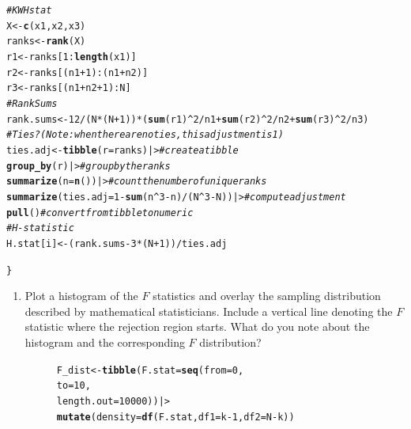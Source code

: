 \documentclass{article}\usepackage[]{graphicx}\usepackage[]{xcolor}
\makeatletter
\newcommand{\hlnum}[1]{\textcolor[rgb]{0.686,0.059,0.569}{#1}}%
\newcommand{\hlcom}[1]{\textcolor[rgb]{0.678,0.584,0.686}{\textit{#1}}}%
\newcommand{\hlopt}[1]{\textcolor[rgb]{0,0,0}{#1}}%
\newcommand{\hldef}[1]{\textcolor[rgb]{0.345,0.345,0.345}{#1}}%
\newcommand{\hlkwb}[1]{\textcolor[rgb]{0.69,0.353,0.396}{#1}}%
\newcommand{\hlkwc}[1]{\textcolor[rgb]{0.333,0.667,0.333}{#1}}%
\newcommand{\hlkwd}[1]{\textcolor[rgb]{0.737,0.353,0.396}{\textbf{#1}}}%
\newenvironment{kframe}{%
 \def\at@end@of@kframe{}%
 \ifinner\ifhmode%
  \def\at@end@of@kframe{\end{minipage}}%
  \begin{minipage}{\columnwidth}%
 \fi\fi%
 \def\FrameCommand##1{\hskip\@totalleftmargin \hskip-\fboxsep
 \colorbox{shadecolor}{##1}\hskip-\fboxsep
     \hskip-\linewidth \hskip-\@totalleftmargin \hskip\columnwidth}%
 \MakeFramed {\advance\hsize-\width
   \@totalleftmargin\z@ \linewidth\hsize
   \@setminipage}}%
 {\par\unskip\endMakeFramed%
 \at@end@of@kframe}
\newenvironment{knitrout}{}{} %
\makeatother
\begin{document}
\begin{enumerate}
\begin{knitrout}
\begin{kframe}
\begin{alltt}
  \hlcom{# KW H stat}
  \hldef{X} \hlkwb{<-} \hlkwd{c}\hldef{(x1, x2, x3)}
  \hldef{ranks} \hlkwb{<-} \hlkwd{rank}\hldef{(X)}
  \hldef{r1} \hlkwb{<-} \hldef{ranks[}\hlnum{1}\hlopt{:}\hlkwd{length}\hldef{(x1)]}
  \hldef{r2} \hlkwb{<-} \hldef{ranks[(n1}\hlopt{+}\hlnum{1}\hldef{)}\hlopt{:}\hldef{(n1}\hlopt{+}\hldef{n2)]}
  \hldef{r3} \hlkwb{<-} \hldef{ranks[(n1}\hlopt{+}\hldef{n2}\hlopt{+}\hlnum{1}\hldef{)}\hlopt{:}\hldef{N]}
  \hlcom{# Rank Sums}
  \hldef{rank.sums} \hlkwb{<-} \hlnum{12}\hlopt{/}\hldef{(N}\hlopt{*}\hldef{(N}\hlopt{+}\hlnum{1}\hldef{))} \hlopt{*} \hldef{(}\hlkwd{sum}\hldef{(r1)}\hlopt{^}\hlnum{2}\hlopt{/}\hldef{n1} \hlopt{+} \hlkwd{sum}\hldef{(r2)}\hlopt{^}\hlnum{2}\hlopt{/}\hldef{n2} \hlopt{+} \hlkwd{sum}\hldef{(r3)}\hlopt{^}\hlnum{2}\hlopt{/}\hldef{n3)}
  \hlcom{# Ties? (Note: when there are no ties, this adjustment is 1)}
  \hldef{ties.adj} \hlkwb{<-} \hlkwd{tibble}\hldef{(}\hlkwc{r}\hldef{=ranks) |>} \hlcom{# create a tibble}
    \hlkwd{group_by}\hldef{(r) |>}               \hlcom{# group by the ranks}
    \hlkwd{summarize}\hldef{(}\hlkwc{n}\hldef{=}\hlkwd{n}\hldef{())|>}           \hlcom{# count the number of unique ranks}
    \hlkwd{summarize}\hldef{(}\hlkwc{ties.adj} \hldef{=} \hlnum{1}\hlopt{-}\hlkwd{sum}\hldef{(n}\hlopt{^}\hlnum{3}\hlopt{-}\hldef{n)}\hlopt{/}\hldef{(N}\hlopt{^}\hlnum{3}\hlopt{-}\hldef{N))|>} \hlcom{# compute adjustment}
    \hlkwd{pull}\hldef{()} \hlcom{# convert from tibble to numeric}
  \hlcom{# H-statistic}
  \hldef{H.stat[i]} \hlkwb{<-} \hldef{(rank.sums} \hlopt{-} \hlnum{3}\hlopt{*}\hldef{(N}\hlopt{+}\hlnum{1}\hldef{))}\hlopt{/}\hldef{ties.adj}

\hldef{\}}
\end{alltt}
\end{kframe}
\end{knitrout}

\begin{enumerate}
\item Plot a histogram of the $F$ statistics and overlay the sampling 
distribution described by mathematical statisticians. Include a vertical
line denoting the $F$ statistic where the rejection region starts. What
do you note about the histogram and the corresponding $F$ distribution?

\begin{figure}[H]

\centering

\begin{knitrout}\scriptsize
{}\color{fgcolor}\begin{kframe}
\begin{alltt}
\hldef{F_dist} \hlkwb{<-} \hlkwd{tibble}\hldef{(}\hlkwc{F.stat} \hldef{=} \hlkwd{seq}\hldef{(}\hlkwc{from} \hldef{=} \hlnum{0}\hldef{,}
                              \hlkwc{to} \hldef{=} \hlnum{10}\hldef{,}
                              \hlkwc{length.out} \hldef{=} \hlnum{10000}\hldef{)) |>}
  \hlkwd{mutate}\hldef{(}\hlkwc{density} \hldef{=} \hlkwd{df}\hldef{(F.stat,} \hlkwc{df1} \hldef{= k}\hlopt{-}\hlnum{1}\hldef{,} \hlkwc{df2} \hldef{= N}\hlopt{-}\hldef{k))}


\end{alltt}
\end{kframe}
\end{knitrout}
\end{figure}
\end{enumerate}
\end{enumerate}
\end{document}
